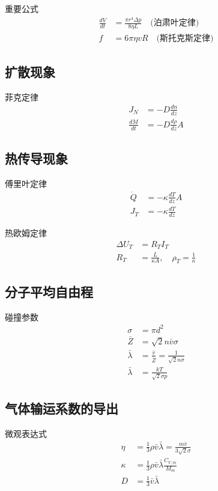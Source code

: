 \documentclass[12pt]{article}
\begin{document}
重要公式
\begin{align*}
    \frac{dV}{dt} &= \frac{\pi r^4 \Delta p}{8\eta L} \quad \text{(泊肃叶定律)} \\
    f &= 6\pi\eta v R \quad \text{(斯托克斯定律)}
\end{align*}

\subsection{扩散现象}
菲克定律
\begin{align*}
    J_N &= -D \frac{dn}{dz} \\
    \frac{dM}{dt} &= -D \frac{d\rho}{dz} A
\end{align*}

\subsection{热传导现象}
傅里叶定律
\begin{align*}
    \dot{Q} &= -\kappa \frac{dT}{dz} A \\
    J_T &= -\kappa \frac{dT}{dz}
\end{align*}

热欧姆定律
\begin{align*}
    \Delta U_T &= R_T I_T \\
    R_T &= \frac{L}{\kappa A}, \quad \rho_T = \frac{1}{\kappa}
\end{align*}

\subsection{分子平均自由程}
碰撞参数
\begin{align*}
    \sigma &= \pi d^2 \\
    \bar{Z} &= \sqrt{2}n\bar{v}\sigma \\
    \bar{\lambda} &= \frac{\bar{v}}{\bar{Z}} = \frac{1}{\sqrt{2}n\sigma} \\
    \bar{\lambda} &= \frac{kT}{\sqrt{2}\sigma p}
\end{align*}

\subsection{气体输运系数的导出}
微观表达式
\begin{align*}
    \eta &= \frac{1}{3}\rho\bar{v}\bar{\lambda} = \frac{m\bar{v}}{3\sqrt{2}\sigma} \\
    \kappa &= \frac{1}{3}\rho\bar{v}\bar{\lambda} \frac{C_{V,m}}{M_m} \\
    D &= \frac{1}{3}\bar{v}\bar{\lambda}
\end{align*}
\end{document}
